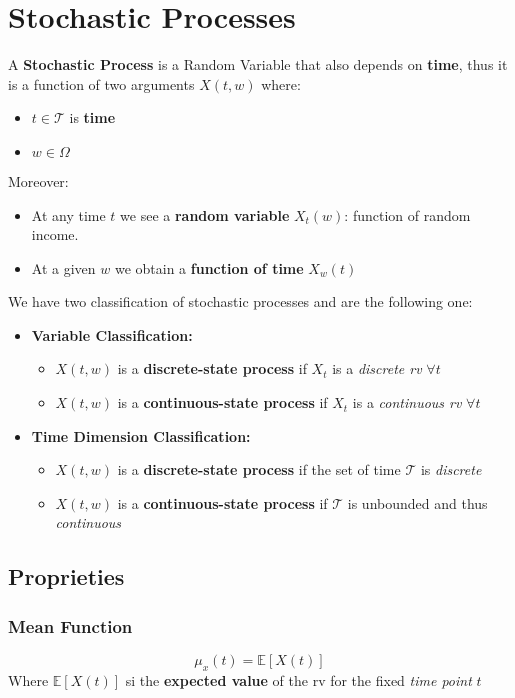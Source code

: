 \chapter{Stochastic Processes}
\begin{tcolorbox}
A \textbf{Stochastic Process} is a Random Variable that also depends on \textbf{time}, thus it is a function of two arguments \(X(t,w)\) where:
\begin{itemize}
    \item \(t \in \mathcal{T}\) is \textbf{time}
    \item \(w \in \Omega\)
\end{itemize}
Moreover:
\begin{itemize}
    \item At any time \(t\) we see a \textbf{random variable} \(X_t(w)\): function of random income.
    \item At a given \(w\) we obtain a \textbf{function of time} \(X_w(t)\)
\end{itemize}
\end{tcolorbox}

We have two classification of stochastic processes and are the following one:
\begin{itemize}
    \item \textbf{Variable Classification:}
    \begin{itemize}
        \item \(X(t,w)\) is a \textbf{discrete-state process} if \(X_t\) is a \textit{discrete rv} \(\forall t\)
        \item \(X(t,w)\) is a \textbf{continuous-state process} if \(X_t\) is a \textit{continuous rv} \(\forall t\)
    \end{itemize}
    \item \textbf{Time Dimension Classification:}
    \begin{itemize}
        \item \(X(t,w)\) is a \textbf{discrete-state process} if the set of time \(\mathcal{T}\) is \textit{discrete}
        \item \(X(t,w)\) is a \textbf{continuous-state process} if \(\mathcal{T}\) is unbounded and thus \textit{continuous} 
    \end{itemize}
\end{itemize}

\section{Proprieties}
\subsection{Mean Function}
\[\mu_x(t) = \mathbb{E}[X(t)]\]
Where \(\mathbb{E}[X(t)]\) si the \textbf{expected value} of the rv for the fixed \textit{time point} \(t\)


